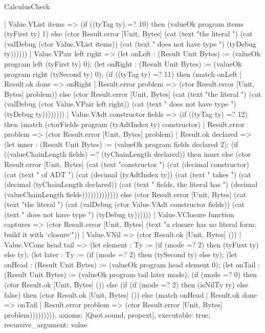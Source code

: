 \begin{lexlean}{CalculusCheck}
\begin{semanticmodule}
{    | Value.VList items => (if ((tyTag ty) =? 10) then (valueOk program items (tyFirst ty) 1) else (ctor Result.error [Unit, Bytes] (cat (text "the literal ") (cat (valDebug (ctor Value.VList items)) (cat (text " does not have type ") (tyDebug ty))))))
    | Value.VPair left right => (let onLeft : (Result Unit Bytes) := (valueOk program left (tyFirst ty) 0); (let onRight : (Result Unit Bytes) := (valueOk program right (tySecond ty) 0); (if ((tyTag ty) =? 11) then (match onLeft
      | Result.ok done => onRight
      | Result.error problem => (ctor Result.error [Unit, Bytes] problem)) else (ctor Result.error [Unit, Bytes] (cat (text "the literal ") (cat (valDebug (ctor Value.VPair left right)) (cat (text " does not have type ") (tyDebug ty))))))))
    | Value.VAdt constructor fields => (if ((tyTag ty) =? 12) then (match (ctorFields program (tyAdtIndex ty) constructor)
      | Result.error problem => (ctor Result.error [Unit, Bytes] problem)
      | Result.ok declared => (let inner : (Result Unit Bytes) := (valueOk program fields declared 2); (if ((valueChainLength fields) =? (tyChainLength declared)) then inner else (ctor Result.error [Unit, Bytes] (cat (text "constructor ") (cat (decimal constructor) (cat (text " of ADT ") (cat (decimal (tyAdtIndex ty)) (cat (text " takes ") (cat (decimal (tyChainLength declared)) (cat (text " fields, the literal has ") (decimal (valueChainLength fields))))))))))))) else (ctor Result.error [Unit, Bytes] (cat (text "the literal ") (cat (valDebug (ctor Value.VAdt constructor fields)) (cat (text " does not have type ") (tyDebug ty))))))
    | Value.VClosure function captures => (ctor Result.error [Unit, Bytes] (text "a closure has no literal form; build it with `closure`"))
    | Value.VNil => (ctor Result.ok [Unit, Bytes] ())
    | Value.VCons head tail => (let element : Ty := (if (mode =? 2) then (tyFirst ty) else ty); (let later : Ty := (if (mode =? 2) then (tySecond ty) else ty); (let onHead : (Result Unit Bytes) := (valueOk program head element 0); (let onTail : (Result Unit Bytes) := (valueOk program tail later mode); (if (mode =? 0) then (ctor Result.ok [Unit, Bytes] ()) else (if (if (mode =? 2) then (isNilTy ty) else false) then (ctor Result.ok [Unit, Bytes] ()) else (match onHead
      | Result.ok done => onTail
      | Result.error problem => (ctor Result.error [Unit, Bytes] problem))))))))),
  axioms: [Quot.sound, propext],
  executable: true,
  recursive_argument: value
}


\end{semanticmodule}
\end{lexlean}
